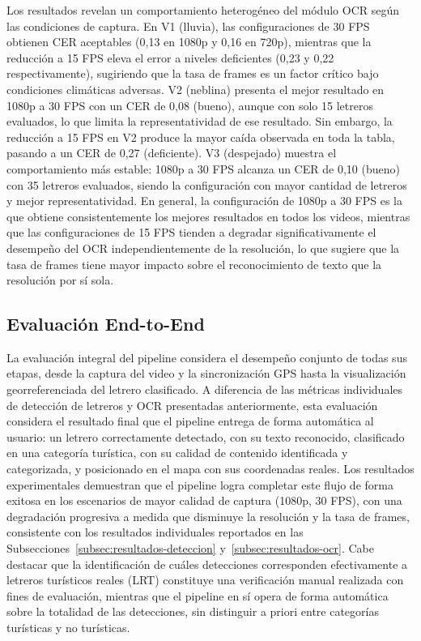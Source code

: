 \documentclass[runningheads]{llncs}
\begin{document}
Los resultados revelan un comportamiento 
heterogéneo del módulo OCR según las condiciones de captura. En V1 
(lluvia), las configuraciones de 30 FPS obtienen CER aceptables 
(0,13 en 1080p y 0,16 en 720p), mientras que la reducción a 15 FPS 
eleva el error a niveles deficientes (0,23 y 0,22 respectivamente), 
sugiriendo que la tasa de frames es un factor crítico bajo condiciones 
climáticas adversas. V2 (neblina) presenta el mejor resultado en 
1080p a 30 FPS con un CER de 0,08 (bueno), aunque con solo 15 letreros 
evaluados, lo que limita la representatividad de ese resultado. Sin 
embargo, la reducción a 15 FPS en V2 produce la mayor caída observada 
en toda la tabla, pasando a un CER de 0,27 (deficiente). V3 
(despejado) muestra el comportamiento más estable: 1080p a 30 FPS 
alcanza un CER de 0,10 (bueno) con 35 letreros evaluados, siendo la 
configuración con mayor cantidad de letreros y mejor representatividad. 
En general, la configuración de 1080p a 30 FPS es la que obtiene 
consistentemente los mejores resultados en todos los videos, mientras 
que las configuraciones de 15 FPS tienden a degradar significativamente 
el desempeño del OCR independientemente de la resolución, lo que 
sugiere que la tasa de frames tiene mayor impacto sobre el 
reconocimiento de texto que la resolución por sí sola.

\subsection{Evaluación End-to-End}
La evaluación integral del pipeline considera el desempeño conjunto 
de todas sus etapas, desde la captura del video y la sincronización 
GPS hasta la visualización georreferenciada del letrero clasificado. 
A diferencia de las métricas individuales de detección de letreros y OCR 
presentadas anteriormente, esta evaluación considera el resultado 
final que el pipeline entrega de forma automática al usuario: un 
letrero correctamente detectado, con su texto reconocido, clasificado 
en una categoría turística, con su calidad de contenido identificada 
y categorizada, y posicionado en el mapa con sus coordenadas reales. 
Los resultados experimentales demuestran que el pipeline logra 
completar este flujo de forma exitosa en los escenarios de mayor 
calidad de captura (1080p, 30 FPS), con una degradación progresiva a 
medida que disminuye la resolución y la tasa de frames, consistente 
con los resultados individuales reportados en las 
Subsecciones~\ref{subsec:resultados-deteccion} 
y~\ref{subsec:resultados-ocr}. Cabe destacar que la identificación de 
cuáles detecciones corresponden efectivamente a letreros turísticos 
reales (LRT) constituye una verificación manual realizada con fines 
de evaluación, mientras que el pipeline en sí opera de forma 
automática sobre la totalidad de las detecciones, sin distinguir a 
priori entre categorías turísticas y no turísticas.
\end{document}
